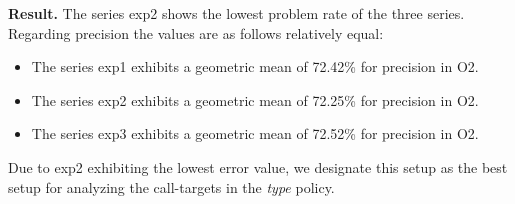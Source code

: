 \textbf{Result.} The series exp2 shows the lowest problem rate of the three series. Regarding precision the values are as follows relatively equal:
\begin{itemize}
\item The series exp1 exhibits a geometric mean of 72.42\% for precision in O2.
\item The series exp2 exhibits a geometric mean of 72.25\% for precision in O2.
\item The series exp3 exhibits a geometric mean of 72.52\% for precision in O2. 
\end{itemize}
Due to exp2 exhibiting the lowest error value, we designate this setup as the best setup for analyzing the call-targets in the \textit{type} policy.

\begin{table}[h!]
		\caption {The results for call-target analysis for exp1 and exp2 of the \textit{type} policy throughout different optimizations.}
		\label{tbl:CTdestinterexp12TYPE}
\end{table}


